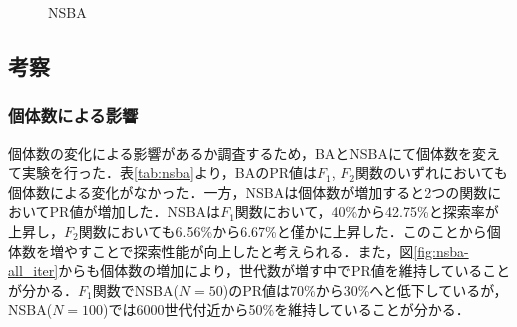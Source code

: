 \documentclass[a4j,11pt]{jarticle}
\begin{document}
\begin{figure}[t]
\centering
{}
\caption{NSBA}
\label{fig:nsba-results_nsba}
\end{figure}

\subsection{考察}
\label{ss:nsba-disc}

\subsubsection{個体数による影響}
個体数の変化による影響があるか調査するため，BAとNSBAにて個体数を変えて実験を行った．表\ref{tab:nsba}より，BAのPR値は$F_1$, $F_2$関数のいずれにおいても個体数による変化がなかった．一方，NSBAは個体数が増加すると2つの関数においてPR値が増加した．NSBAは$F_1$関数において，40\%から42.75\%と探索率が上昇し，$F_2$関数においても6.56\%から6.67\%と僅かに上昇した．このことから個体数を増やすことで探索性能が向上したと考えられる．また，図\ref{fig:nsba-all_iter}からも個体数の増加により，世代数が増す中でPR値を維持していることが分かる．$F_1$関数でNSBA($N=50$)のPR値は70\%から30\%へと低下しているが，NSBA($N=100$)では6000世代付近から50\%を維持していることが分かる．
\end{document}
